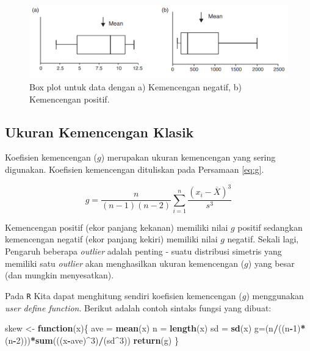 \documentclass[]{book}
\newenvironment{Shaded}{\begin{snugshade}}{\end{snugshade}}
\newcommand{\KeywordTok}[1]{\textcolor[rgb]{0.13,0.29,0.53}{\textbf{#1}}}
\newcommand{\DecValTok}[1]{\textcolor[rgb]{0.00,0.00,0.81}{#1}}
\newcommand{\StringTok}[1]{\textcolor[rgb]{0.31,0.60,0.02}{#1}}
\newcommand{\ControlFlowTok}[1]{\textcolor[rgb]{0.13,0.29,0.53}{\textbf{#1}}}
\newcommand{\OperatorTok}[1]{\textcolor[rgb]{0.81,0.36,0.00}{\textbf{#1}}}
\newcommand{\NormalTok}[1]{#1}
\begin{document}
\begin{figure}

{\centering \includegraphics[width=0.7\linewidth]{skewnessbox} 

}

\caption{Box plot untuk data dengan a) Kemencengan negatif, b) Kemencengan positif.}\label{fig:skew2}
\end{figure}

\subsection{Ukuran Kemencengan Klasik}\label{ukuran-kemencengan-klasik}

Koefisien kemencengan (\(g\)) merupakan ukuran kemencengan yang sering
digunakan. Koefisien kemencengan dituliskan pada Persamaan \eqref{eq:g}.

\begin{equation}
  g=\frac{n}{\left(n-1\right)\left(n-2\right)}\sum_{i=1}^n\frac{\left(x_i-\overline{X}\right)^3}{s^3}
  \label{eq:g}
\end{equation}

Kemencengan positif (ekor panjang kekanan) memiliki nilai \(g\) positif
sedangkan kemencengan negatif (ekor panjang kekiri) memiliki nilai \(g\)
negatif. Sekali lagi, Pengaruh beberapa \emph{outlier} adalah penting -
suatu distribusi simetris yang memiliki satu \emph{outlier} akan
menghasilkan ukuran kemencengan (\(g\)) yang besar (dan mungkin
menyesatkan).

Pada \texttt{R} Kita dapat menghitung sendiri koefisien kemencengan
(\(g\)) menggunakan \emph{user define function}. Berikut adalah contoh
sintaks fungsi yang dibuat:

\begin{Shaded}
\begin{Highlighting}[]
\NormalTok{skew <-}\StringTok{ }\ControlFlowTok{function}\NormalTok{(x)\{}
\NormalTok{  ave =}\StringTok{ }\KeywordTok{mean}\NormalTok{(x)}
\NormalTok{  n =}\StringTok{ }\KeywordTok{length}\NormalTok{(x)}
\NormalTok{  sd =}\StringTok{ }\KeywordTok{sd}\NormalTok{(x)}
\NormalTok{  g=(n}\OperatorTok{/}\NormalTok{((n}\OperatorTok{-}\DecValTok{1}\NormalTok{)}\OperatorTok{*}\NormalTok{(n}\OperatorTok{-}\DecValTok{2}\NormalTok{)))}\OperatorTok{*}\KeywordTok{sum}\NormalTok{(((x}\OperatorTok{-}\NormalTok{ave)}\OperatorTok{^}\DecValTok{3}\NormalTok{)}\OperatorTok{/}\NormalTok{(sd}\OperatorTok{^}\DecValTok{3}\NormalTok{))}
  \KeywordTok{return}\NormalTok{(g)}
\NormalTok{\}}
\end{Highlighting}
\end{Shaded}
\end{document}
